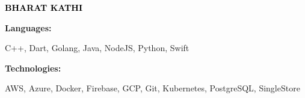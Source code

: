 \documentclass[9pt]{developercv} %
\begin{document}

\begin{minipage}[t]{0.5\textwidth} 
	\vspace{-\baselineskip} %
	
	{ \fontsize{16}{20} \textcolor{black}{\textbf{\MakeUppercase{Bharat Kathi}}}} %
	
	\vspace{6pt}
    \hspace{22pt}

    \hspace{12pt}
    
\end{minipage}
\hfill
\begin{minipage}[t]{0.5\textwidth}
    \vspace{-18pt}
    \vspace{-6pt}
    
    \begin{minipage}[t]{0.2\textwidth}
        \textbf{Languages:}
    \end{minipage}
    \hfill
    \begin{minipage}[t]{0.73\textwidth}
        C++, Dart, Golang, Java, NodeJS, Python, Swift
    \end{minipage}
    \vspace{4mm}
    
    \begin{minipage}[t]{0.2\textwidth}
        \textbf{Technologies:}
    \end{minipage}
    \hfill
    \begin{minipage}[t]{0.73\textwidth}
        AWS, Azure, Docker, Firebase, GCP, Git, Kubernetes, PostgreSQL, SingleStore
    \end{minipage}
    
\end{minipage}


\vspace{-4 pt}
\begin{entrylist}
    
\end{entrylist}
\end{document}
